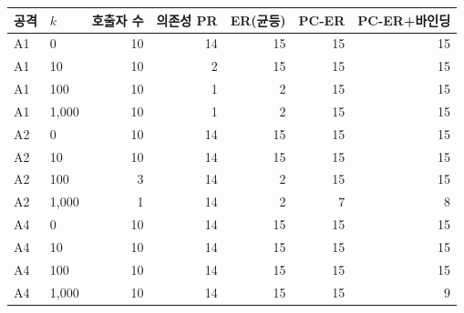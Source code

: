 \begin{tabular}{@{}llrrrrr@{}}
\toprule
공격 & $k$ & 호출자 수 & 의존성 PR & ER(균등) & PC-ER & PC-ER+바인딩 \\
\midrule
A1 & 0 & 10 & 14 & 15 & 15 & 15 \\
A1 & 10 & 10 & 2 & 15 & 15 & 15 \\
A1 & 100 & 10 & 1 & 2 & 15 & 15 \\
A1 & 1,000 & 10 & 1 & 2 & 15 & 15 \\
\addlinespace
A2 & 0 & 10 & 14 & 15 & 15 & 15 \\
A2 & 10 & 10 & 14 & 15 & 15 & 15 \\
A2 & 100 & 3 & 14 & 2 & 15 & 15 \\
A2 & 1,000 & 1 & 14 & 2 & 7 & 8 \\
\addlinespace
A4 & 0 & 10 & 14 & 15 & 15 & 15 \\
A4 & 10 & 10 & 14 & 15 & 15 & 15 \\
A4 & 100 & 10 & 14 & 15 & 15 & 15 \\
A4 & 1,000 & 10 & 14 & 15 & 15 & 9 \\
\bottomrule
\end{tabular}
